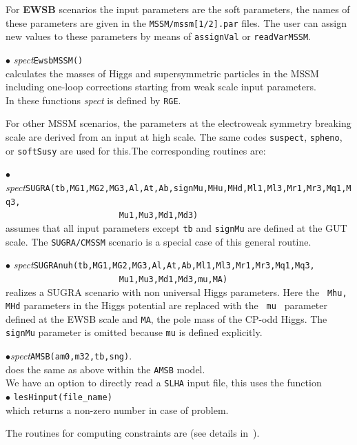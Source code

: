 \documentclass[12pt,a4paper]{article}
\begin{document}
For {\bf EWSB} scenarios the input parameters are  the soft parameters, the names 
of these parameters are given in the {\tt MSSM/mssm[1/2].par} files.
The user  can assign new values to these parameters by means of {\tt assignVal}
or {\tt readVarMSSM}.  

\noindent $\bullet$ {\it spect}\verb|EwsbMSSM()|\\
 calculates the  masses of Higgs  and
supersymmetric particles in the MSSM including one-loop
corrections starting from weak scale input parameters. \\
In these functions {\it spect}  is defined by \verb|RGE|.
 

For other MSSM scenarios, the   parameters at the electroweak symmetry breaking scale are derived from 
an  input at high scale. The same codes {\tt suspect}, 
{\tt spheno}, or {\tt softSusy} are used for this.The corresponding
routines are:

\noindent $\bullet$ {\it
spect}\verb|SUGRA(tb,MG1,MG2,MG3,Al,At,Ab,signMu,MHu,MHd,Ml1,Ml3,Mr1,Mr3,Mq1,Mq3,|\\
\verb|                       Mu1,Mu3,Md1,Md3)|\\
assumes that  all input parameters except {\tt tb} and {\tt signMu}  are
defined at the GUT scale. The {\tt SUGRA/CMSSM} scenario is a special case of this general routine. 

\noindent $\bullet$ {\it
spect}\verb|SUGRAnuh(tb,MG1,MG2,MG3,Al,At,Ab,Ml1,Ml3,Mr1,Mr3,Mq1,Mq3,|\\
\verb|                       Mu1,Mu3,Md1,Md3,mu,MA)|\\
realizes a SUGRA scenario with non universal Higgs parameters. Here the {\tt
Mhu, MHd} parameters in the Higgs potential are replaced with the {\tt
mu } parameter defined at the  EWSB scale and {\tt MA}, the pole mass of the CP-odd Higgs. The
{\tt signMu} parameter is omitted  because {\tt mu} is defined
explicitly.

\noindent
$\bullet${\it spect}\verb|AMSB(am0,m32,tb,sng)|.\\
does  the same as above within the {\tt AMSB} model.\\

We  have an option to directly read a {\tt SLHA}  input file, this uses the  function \\
\noi$\bullet$ \verb|lesHinput(file_name) |\\
which returns a non-zero number in case of problem.

The routines for computing constraints are (see details
in~\cite{Belanger:2004yn}).
\end{document}
